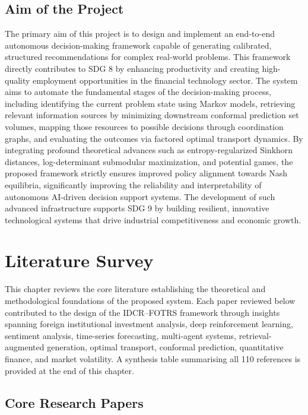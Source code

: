 \documentclass[12pt,a4paper,oneside]{report}
\theoremstyle{definition}
\theoremstyle{remark}
\begin{document}
\section{Aim of the Project}

The primary aim of this project is to design and implement an end-to-end autonomous decision-making framework capable of generating calibrated, structured recommendations for complex real-world problems. This framework directly contributes to SDG 8 by enhancing productivity and creating high-quality employment opportunities in the financial technology sector. The system aims to automate the fundamental stages of the decision-making process, including identifying the current problem state using Markov models, retrieving relevant information sources by minimizing downstream conformal prediction set volumes, mapping those resources to possible decisions through coordination graphs, and evaluating the outcomes via factored optimal transport dynamics. By integrating profound theoretical advances such as entropy-regularized Sinkhorn distances, log-determinant submodular maximization, and potential games, the proposed framework strictly ensures improved policy alignment towards Nash equilibria, significantly improving the reliability and interpretability of autonomous AI-driven decision support systems. The development of such advanced infrastructure supports SDG 9 by building resilient, innovative technological systems that drive industrial competitiveness and economic growth.

\chapter{Literature Survey}

This chapter reviews the core literature establishing the theoretical and methodological foundations of the proposed system. Each paper reviewed below contributed to the design of the IDCR--FOTRS framework through insights spanning foreign institutional investment analysis, deep reinforcement learning, sentiment analysis, time-series forecasting, multi-agent systems, retrieval-augmented generation, optimal transport, conformal prediction, quantitative finance, and market volatility. A synthesis table summarising all 110 references is provided at the end of this chapter.

\section{Core Research Papers}
\end{document}
